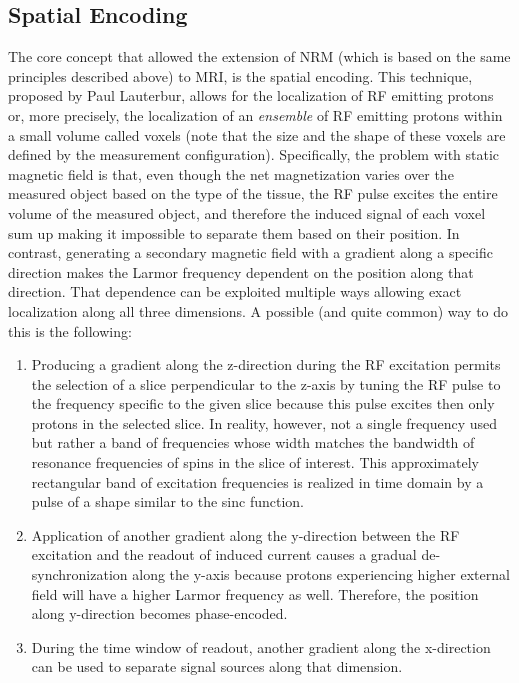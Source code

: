 \subsection{Spatial Encoding}
The core concept that allowed the extension of NRM (which is based on the same principles described above) to MRI, is the spatial encoding. This technique, proposed by Paul Lauterbur, allows for the localization of RF emitting protons or, more precisely, the localization of an \textit{ensemble} of RF emitting protons within a small volume called voxels (note that the size and the shape of these voxels are defined by the measurement configuration). Specifically, the problem with static magnetic field is that, even though the net magnetization varies over the measured object based on the type of the tissue, the RF pulse excites the entire volume of the measured object, and therefore the induced signal of each voxel sum up making it impossible to separate them based on their position. In contrast, generating a secondary magnetic field with a gradient along a specific direction makes the Larmor frequency dependent on the position along that direction. That dependence can be exploited multiple ways allowing exact localization along all three dimensions. A possible (and quite common) way to do this is the following:
\begin{enumerate}
    \item Producing a gradient along the z-direction during the RF excitation permits the selection of a slice perpendicular to the z-axis by tuning the RF pulse to the frequency specific to the given slice because this pulse excites then only protons in the selected slice. In reality, however, not a single frequency used but rather a band of frequencies whose width matches the bandwidth of resonance frequencies of spins in the slice of interest. This approximately rectangular band of excitation frequencies is realized in time domain by a pulse of a shape similar to the sinc function.
    \item Application of another gradient along the y-direction between the RF excitation and the readout of induced current causes a gradual de-synchronization along the y-axis because protons experiencing higher external field will have a higher Larmor frequency as well. Therefore, the position along y-direction becomes phase-encoded.
    \item During the time window of readout, another gradient along the x-direction can be used to separate signal sources along that dimension.
\end{enumerate}
